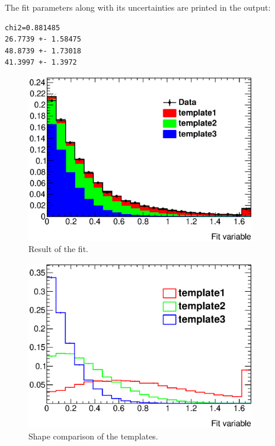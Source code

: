 \documentclass[12pt]{article}
\begin{document}
The fit parameters along with its uncertainties are printed in the
output:

\begin{verbatim}
chi2=0.881485
26.7739 +- 1.58475
48.8739 +- 1.73018
41.3997 +- 1.3972
\end{verbatim}

\FloatBarrier

\begin{figure}[hbtp]
\begin{center}
\includegraphics[width=10cm]{pics/result.eps}
\caption{Result of the fit.}
\label{fig:result}
\end{center}
\end{figure}

\begin{figure}[hbtp]
\begin{center}
\includegraphics[width=10cm]{pics/shape.eps}
\caption{Shape comparison of the templates.}
\label{fig:shape}
\end{center}
\end{figure}
\end{document}
